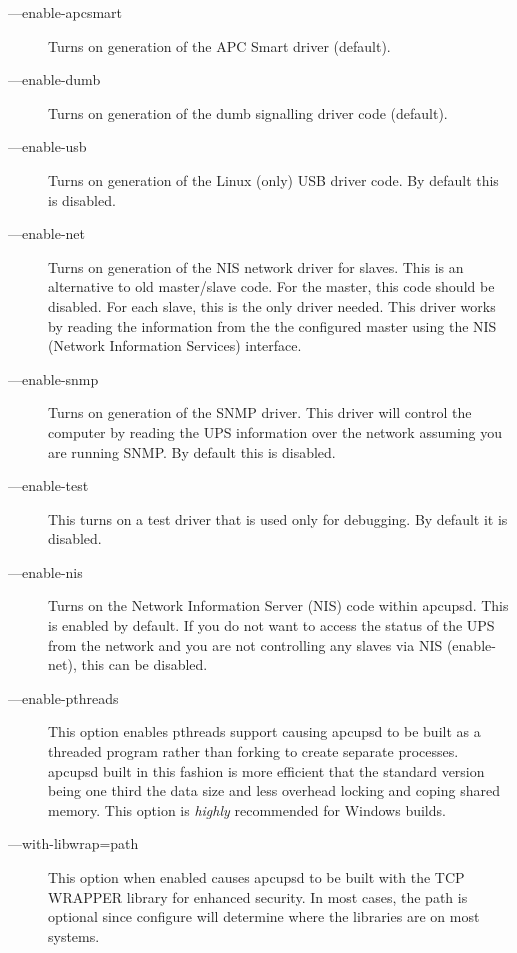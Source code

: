 \begin{description}
\item [{---}enable-apcsmart]
   Turns on generation of the APC Smart driver (default).  

\item [{---}enable-dumb]
   Turns on generation of the dumb signalling driver code (default).  

\item [{---}enable-usb]
   Turns on generation of the Linux (only) USB driver code. By default this is
disabled.  

\item [{---}enable-net]
   Turns on generation of the NIS network driver for slaves. This is an
alternative to old master/slave code. For the master, this code should be
disabled. For each slave, this is the only driver needed. This driver works by
reading the information from the the configured master using the NIS (Network
Information Services) interface.  

\item [{---}enable-snmp]
   Turns on generation of the SNMP driver. This driver will control the computer
by reading the UPS information over the network assuming you are running SNMP.
By default this is disabled.  

\item [{---}enable-test]
   This turns on a test driver that is used only for debugging. By default it is
disabled.  

\item [{---}enable-nis]
   Turns on the Network Information Server (NIS) code within apcupsd. This is
enabled by default. If you do not want to access the status of the UPS from
the network and you are not controlling any slaves via NIS (enable-net), this
can be disabled.  

\item [{---}enable-pthreads]
   This option enables pthreads support causing apcupsd to be built as a threaded
program rather than forking to create separate processes. apcupsd built in
this fashion is more efficient that the standard version being one third the
data size and less overhead locking and coping shared memory. This option is
{\it highly} recommended for Windows builds.  

\item [{---}with-libwrap=\lt{}path\gt{}]
   This option when enabled causes apcupsd to be built with the TCP WRAPPER
library for enhanced security. In most cases, the \lt{}path\gt{} is optional
since configure will determine where the libraries are on most systems.  


\end{description}
